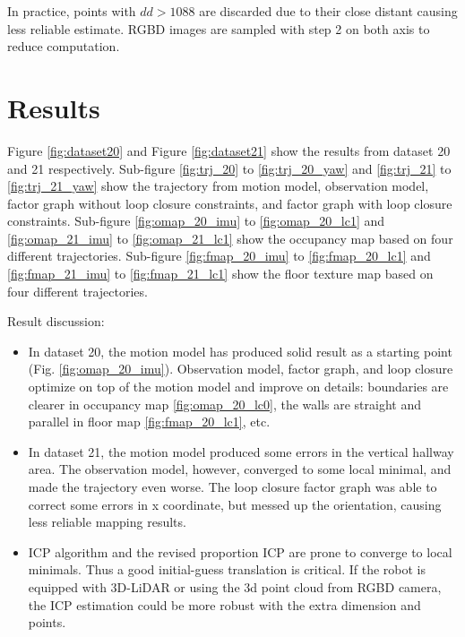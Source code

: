 \documentclass[conference]{IEEEtran}
\begin{document}
In practice, points with $dd > 1088$ are discarded due to 
their close distant causing less reliable estimate.
RGBD images are sampled with step 2 on both axis 
to reduce computation.


\section{Results}
Figure \ref*{fig:dataset20} and Figure \ref*{fig:dataset21} show 
the results from dataset 20 and 21 respectively.
Sub-figure \ref*{fig:trj_20} to \ref*{fig:trj_20_yaw} and 
\ref*{fig:trj_21} to \ref*{fig:trj_21_yaw} show
the trajectory from motion model, observation model, 
factor graph without loop closure constraints, 
and factor graph with loop closure constraints.
Sub-figure \ref*{fig:omap_20_imu} to \ref*{fig:omap_20_lc1} and 
\ref*{fig:omap_21_imu} to \ref*{fig:omap_21_lc1} show
the occupancy map based on four different trajectories.
Sub-figure \ref*{fig:fmap_20_imu} to \ref*{fig:fmap_20_lc1} and 
\ref*{fig:fmap_21_imu} to \ref*{fig:fmap_21_lc1} show
the floor texture map based on four different trajectories.

Result discussion:
\begin{itemize}
    \item In dataset 20, 
    the motion model has produced solid result as a starting point (Fig. \ref*{fig:omap_20_imu}). 
    Observation model, factor graph, and loop closure optimize 
    on top of the motion model and improve on details: 
    boundaries are clearer in occupancy map \ref*{fig:omap_20_lc0},
    the walls are straight and parallel in floor map \ref*{fig:fmap_20_lc1}, 
    etc.
    \item In dataset 21,
    the motion model produced some errors in the vertical hallway area.
    The observation model, however, converged to some local minimal, and made the trajectory even worse.
    The loop closure factor graph was able to correct some errors in x coordinate, 
    but messed up the orientation, causing less reliable mapping results.
    \item ICP algorithm and the revised proportion ICP are prone to converge to local minimals. 
    Thus a good initial-guess translation is critical. 
    If the robot is equipped with 3D-LiDAR or using the 3d point cloud from RGBD camera, 
    the ICP estimation could be more robust with the extra dimension and points.
\end{itemize}
\end{document}
